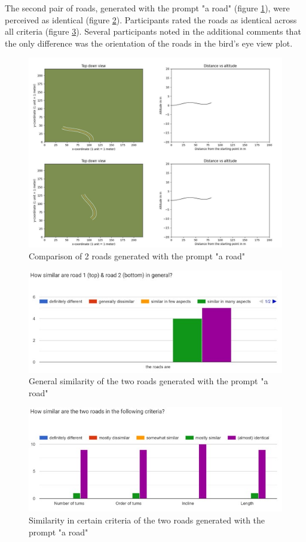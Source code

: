 The second pair of roads, generated with the prompt "a road" (figure \ref{comparison_a_road}), were perceived as identical (figure \ref{general_similarity_a_road}). Participants rated the roads as identical across all criteria (figure \ref{specific_similarity_a_road}). Several participants noted in the additional comments that the only difference was the orientation of the roads in the bird's eye view plot.


\begin{figure}[H]
    \centering
    \includegraphics[width=0.75\linewidth]{images/road2_road3.jpg}
    \caption{Comparison of 2 roads generated with the prompt "a road"}
    \label{comparison_a_road}
\end{figure}

\begin{figure}[H]
    \centering
    \includegraphics[width=0.75\linewidth]{images/similarity2_general.jpg}
    \caption{General similarity of the two roads generated with the prompt "a road"}
    \label{general_similarity_a_road}
\end{figure}

\begin{figure}[H]
    \centering
    \includegraphics[width=0.75\linewidth]{images/similarity2_specific.jpg}
    \caption{Similarity in certain criteria of the two roads generated with the prompt "a road"}
    \label{specific_similarity_a_road}
\end{figure}

